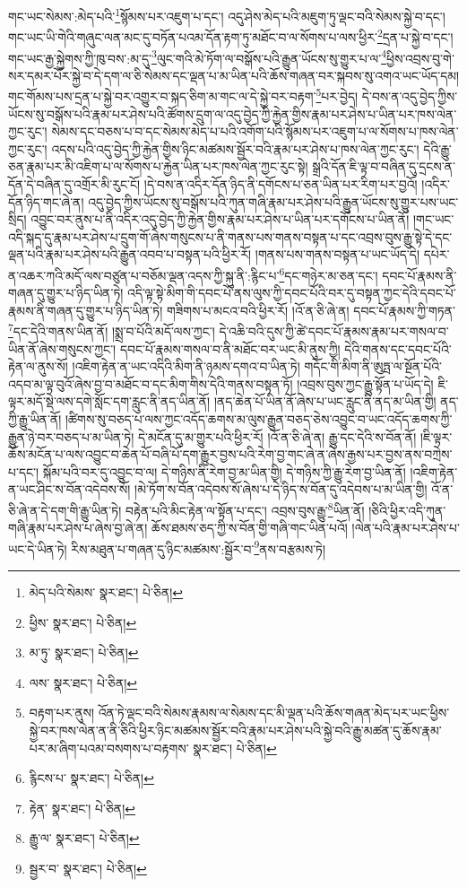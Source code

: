 གང་ཡང་སེམས་:མེད་པའི་\footnote{མེད་པའི་སེམས་  སྣར་ཐང་།  པེ་ཅིན། }སྙོམས་པར་འཇུག་པ་དང་། འདུ་ཤེས་མེད་པའི་མཇུག་ཏུ་ལྡང་བའི་སེམས་སྐྱེ་བ་དང་། གང་ཡང་ཡི་གེའི་གཞུང་ལན་མང་དུ་བཏོན་པའམ་དོན་རྟག་ཏུ་མཐོང་བ་ལ་སོགས་པ་ལས་ཕྱིར་\footnote{ཕྱིས་  སྣར་ཐང་།  པེ་ཅིན། }དྲན་པ་སྐྱེ་བ་དང་། གང་ཡང་རྒྱ་སྐྱེགས་ཀྱི་ཁུ་བས་:མ་དུ་\footnote{མ་ཏུ་  སྣར་ཐང་།  པེ་ཅིན། }ལུང་གའི་མེ་ཏོག་ལ་བསྒོས་པའི་རྒྱུན་ཡོངས་སུ་གྱུར་པ་ལ་\footnote{ལས་  སྣར་ཐང་།  པེ་ཅིན། }ཕྱིས་འབྲས་བུ་གེ་སར་དམར་པོར་སྐྱེ་བ་དེ་དག་ལ་ཅི་སེམས་དང་ལྡན་པ་མ་ཡིན་པའི་ཆོས་གཞན་བར་སྐབས་སུ་འགའ་ཡང་ཡོད་དམ། གང་གོམས་པས་དྲན་པ་སྐྱེ་བར་འགྱུར་བ་སྐད་ཅིག་མ་གང་ལ་དེ་སྐྱེ་བར་བརྟག་\footnote{བརྟག་པར་ནུས། འོན་ཏེ་ལྡང་བའི་སེམས་རྣམས་ལ་སེམས་དང་མི་ལྡན་པའི་ཆོས་གཞན་མེད་པར་ཡང་ཕྱིས་སྐྱེ་བར་ཁས་ལེན་ན་ནི་ཅིའི་ཕྱིར་ཉིང་མཚམས་སྦྱོར་བའི་རྣམ་པར་ཤེས་པའི་སྐྱེ་བའི་རྒྱུ་མཚན་དུ་ཆོས་རྣམ་པར་མ་ཞིག་པའམ་བསགས་པ་བརྟགས་  སྣར་ཐང་།  པེ་ཅིན། }པར་བྱེད། དེ་བས་ན་འདུ་བྱེད་ཀྱིས་ཡོངས་སུ་བསྒོས་པའི་རྣམ་པར་ཤེས་པའི་ཚོགས་དྲུག་ལ་འདུ་བྱེད་ཀྱི་རྐྱེན་གྱིས་རྣམ་པར་ཤེས་པ་ཡིན་པར་ཁས་ལེན་ཀྱང་རུང་། སེམས་དང་བཅས་པ་བ་དང་སེམས་མེད་པ་པའི་འགོག་པའི་སྙོམས་པར་འཇུག་པ་ལ་སོགས་པ་ཁས་ལེན་ཀྱང་རུང་། འདས་པའི་འདུ་བྱེད་ཀྱི་རྐྱེན་གྱིས་ཉིང་མཚམས་སྦྱོར་བའི་རྣམ་པར་ཤེས་པ་ཁས་ལེན་ཀྱང་རུང་། དེའི་རྒྱུ་ཅན་རྣམ་པར་མི་འཇིག་པ་ལ་སོགས་པ་རྐྱེན་ཡིན་པར་ཁས་ལེན་ཀྱང་རུང་སྟེ། སྒྲའི་དོན་ཇི་ལྟ་བ་བཞིན་དུ་དྲངས་ན་དོན་དེ་བཞིན་དུ་འགྲོར་མི་རུང་ངོ། །དེ་བས་ན་འདིར་དོན་ཉིད་ནི་དགོངས་པ་ཅན་ཡིན་པར་རིག་པར་བྱའོ། །འདིར་དོན་ཉིད་གང་ཞེ་ན། འདུ་བྱེད་ཀྱིས་ཡོངས་སུ་བསྒོས་པའི་ཀུན་གཞི་རྣམ་པར་ཤེས་པའི་རྒྱུན་ཡོངས་སུ་གྱུར་པས་ཡང་སྲིད། འབྱུང་བར་ནུས་པ་ནི་འདིར་འདུ་བྱེད་ཀྱི་རྐྱེན་གྱིས་རྣམ་པར་ཤེས་པ་ཡིན་པར་དགོངས་པ་ཡིན་ནོ། །གང་ཡང་འདི་སྐད་དུ་རྣམ་པར་ཤེས་པ་དྲུག་གོ་ཞེས་གསུངས་པ་ནི་གནས་པས་གནས་བསྟན་པ་དང་འབྲས་བུས་རྒྱུ་སྟེ་དེ་དང་ལྡན་པའི་རྣམ་པར་ཤེས་པའི་རྒྱུན་འབབ་པ་བསྟན་པའི་ཕྱིར་རོ། །གནས་པས་གནས་བསྟན་པ་ཡང་ཡོད་དེ། དཔེར་ན་འཆར་ཀའི་མདོ་ལས་བཙུན་པ་བཅོམ་ལྡན་འདས་ཀྱི་སྐུ་ནི་:རྙིང་པ་\footnote{རྙིངས་པ་  སྣར་ཐང་།  པེ་ཅིན། }དང་གཉེར་མ་ཅན་དང་། དབང་པོ་རྣམས་ནི་གཞན་དུ་གྱུར་པ་ཉིད་ཡིན་ཏེ། འདི་ལྟ་སྟེ་མིག་གི་དབང་པོ་ནས་ལུས་ཀྱི་དབང་པོའི་བར་དུ་བསྟན་ཀྱང་དེའི་དབང་པོ་རྣམས་ནི་གཞན་དུ་གྱུར་པ་ཉིད་ཡིན་ཏེ། གཟིགས་པ་མངའ་བའི་ཕྱིར་རོ། །འོ་ན་ཅི་ཞེ་ན། དབང་པོ་རྣམས་ཀྱི་གཏན་\footnote{རྟེན་  སྣར་ཐང་།  པེ་ཅིན། }དང་དེའི་གནས་ཡིན་ནོ། །སྨྲ་བ་པོའི་མདོ་ལས་ཀྱང་། དེ་འཆི་བའི་དུས་ཀྱི་ཚེ་དབང་པོ་རྣམས་རྣམ་པར་གསལ་བ་ཡིན་ནོ་ཞེས་གསུངས་ཀྱང་། དབང་པོ་རྣམས་གསལ་བ་ནི་མཐོང་བར་ཡང་མི་ནུས་ཀྱི། དེའི་གནས་དང་དབང་པོའི་རྟེན་ལ་ནུས་སོ། །འཇིག་རྟེན་ན་ཡང་འདིའི་མིག་ནི་ཉམས་དགའ་བ་ཡིན་ཏེ། གདོང་གི་མིག་ནི་ཨུཏྤ་ལ་སྔོན་པོའི་འདབ་མ་ལྟ་བུའོ་ཞེས་བྱ་བ་མཐོང་བ་དང་མིག་གིས་དེའི་གནས་བསྟན་ཏོ། །འབྲས་བུས་ཀྱང་རྒྱུ་སྟོན་པ་ཡོད་དེ། ཇི་ལྟར་མདོ་སྡེ་ལས་དགེ་སློང་དག་རླུང་ནི་ནད་ཡིན་ནོ། །ནད་ཆེན་པོ་ཡིན་ནོ་ཞེས་པ་ཡང་རླུང་ནི་ནད་མ་ཡིན་གྱི། ནད་ཀྱི་རྒྱུ་ཡིན་ནོ། །ཚིགས་སུ་བཅད་པ་ལས་ཀྱང་འདོད་ཆགས་མ་ལུས་རྒྱུན་བཅད་ཅེས་འབྱུང་བ་ཡང་འདོད་ཆགས་ཀྱི་རྒྱུན་ཉེ་བར་བཅད་པ་མ་ཡིན་ཏེ། དེ་མངོན་དུ་མ་གྱུར་པའི་ཕྱིར་རོ། །འོ་ན་ཅི་ཞེ་ན། རྒྱུ་དང་དེའི་ས་བོན་ནོ། །ཇི་ལྟར་ཆོས་མངོན་པ་ལས་འབྱུང་བ་ཆེན་པོ་བཞི་པོ་དག་རྒྱུར་བྱས་པའི་རེག་བྱ་གང་ཞེ་ན་ཞེས་རྒྱས་པར་བྱས་ནས་བཀྲེས་པ་དང་། སྐོམ་པའི་བར་དུ་འབྱུང་བ་ལ། དེ་གཉིས་ནི་རེག་བྱ་མ་ཡིན་གྱི། དེ་གཉིས་ཀྱི་རྒྱུ་རེག་བྱ་ཡིན་ནོ། །འཇིག་རྟེན་ན་ཡང་ཤིང་ས་བོན་འདེབས་སོ། །མེ་ཏོག་ས་བོན་འདེབས་སོ་ཞེས་པ་དེ་ཉིད་ས་བོན་དུ་འདེབས་པ་མ་ཡིན་གྱི། འོ་ན་ཅི་ཞེ་ན་དེ་དག་གི་རྒྱུ་ཡིན་ཏེ། བརྟེན་པའི་མིང་རྟེན་ལ་སྟོན་པ་དང་། འབྲས་བུས་རྒྱུ་\footnote{རྒྱུ་ལ་  སྣར་ཐང་།  པེ་ཅིན། }ཡིན་ནོ། །ཅིའི་ཕྱིར་འདི་ཀུན་གཞི་རྣམ་པར་ཤེས་པ་ཞེས་བྱ་ཞེ་ན། ཆོས་ཐམས་ཅད་ཀྱི་ས་བོན་གྱི་གཞི་གང་ཡིན་པའོ། །ལེན་པའི་རྣམ་པར་ཤེས་པ་ཡང་དེ་ཡིན་ཏེ། རིས་མཐུན་པ་གཞན་དུ་ཉིང་མཚམས་:སྦྱོར་བ་\footnote{སྦྱར་བ་  སྣར་ཐང་།  པེ་ཅིན། }ནས་བརྩམས་ཏེ། 